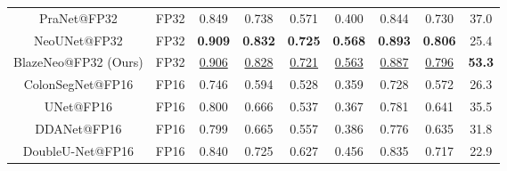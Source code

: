\documentclass{ieeeaccess}
\newcommand{\ModelName}{BlazeNeo\xspace}
\begin{document}
\begin{table*}[ht!]
\begin{tabular}{@{} c | c | c c c c c c | c @{}}
        PraNet@FP32                 & FP32                             & 0.849                                   & 0.738                                  & 0.571                                   & 0.400                                  & 0.844                                   & 0.730                                   & 37.0                    \\
        NeoUNet@FP32                & FP32                             & \textbf{0.909}                          & \textbf{0.832}                         & \textbf{0.725}                          & \textbf{0.568}                         & \textbf{0.893}                          & \textbf{0.806}                          & 25.4                    \\
        \ModelName{}@FP32 (Ours)    & FP32                             & \underline{0.906}                       & \underline{0.828}                      & \underline{0.721}                       & \underline{0.563}                      & \underline{0.887}                       & \underline{0.796}                       & \textbf{53.3}           \\
        \midrule
        ColonSegNet@FP16            & FP16                             & 0.746                                   & 0.594                                  & 0.528                                   & 0.359                                  & 0.728                                   & 0.572                                   & 26.3                    \\
        UNet@FP16                   & FP16                             & 0.800                                   & 0.666                                  & 0.537                                   & 0.367                                  & 0.781                                   & 0.641                                   & 35.5                    \\
        DDANet@FP16                 & FP16                             & 0.799                                   & 0.665                                  & 0.557                                   & 0.386                                  & 0.776                                   & 0.635                                   & 31.8                    \\
        DoubleU-Net@FP16            & FP16                             & 0.840                                   & 0.725                                  & 0.627                                   & 0.456                                  & 0.835                                   & 0.717                                   & 22.9                    \\

\end{tabular}
\end{table*}
\end{document}
